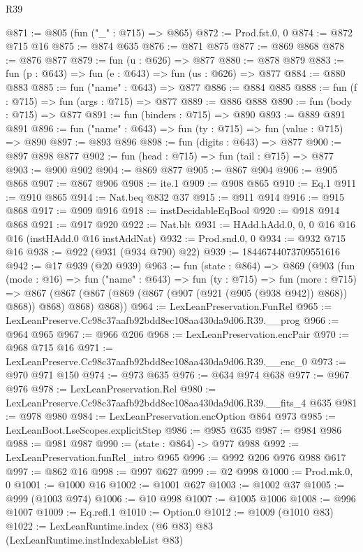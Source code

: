 \begin{lexlean}{R39}
\begin{coremodule}
@871 := @805 (fun ("_" : @715) => @865)
@872 := Prod.fst.{0, 0}
@874 := @872 @715 @16
@875 := @874 @635
@876 := @871 @875
@877 := @869 @868
@878 := @876 @877
@879 := fun (u : @626) => @877
@880 := @878 @879
@883 := fun (p : @643) => fun (e : @643) => fun (us : @626) => @877
@884 := @880 @883
@885 := fun ("name" : @643) => @877
@886 := @884 @885
@888 := fun (f : @715) => fun (args : @715) => @877
@889 := @886 @888
@890 := fun (body : @715) => @877
@891 := fun (binders : @715) => @890
@893 := @889 @891 @891
@896 := fun ("name" : @643) => fun (ty : @715) => fun (value : @715) => @890
@897 := @893 @896
@898 := fun (digits : @643) => @877
@900 := @897 @898 @877
@902 := fun (head : @715) => fun (tail : @715) => @877
@903 := @900 @902
@904 := @869 @877
@905 := @867 @904
@906 := @905 @868
@907 := @867 @906
@908 := ite.{1}
@909 := @908 @865
@910 := Eq.{1}
@911 := @910 @865
@914 := Nat.beq @832 @37
@915 := @911 @914
@916 := @915 @868
@917 := @909 @916
@918 := instDecidableEqBool
@920 := @918 @914 @868
@921 := @917 @920
@922 := Nat.blt
@931 := HAdd.hAdd.{0, 0, 0} @16 @16 @16 (instHAdd.{0} @16 instAddNat)
@932 := Prod.snd.{0, 0}
@934 := @932 @715 @16
@938 := @922 (@931 (@934 @790) @22)
@939 := 18446744073709551616
@942 := @17 @939 (@20 @939)
@963 := fun (state : @864) =>
  @869
    (@903
      (fun (mode : @16) =>
      fun ("name" : @643) =>
      fun (ty : @715) =>
      fun (more : @715) =>
      @867 (@867 (@867 (@869 (@867 (@907 (@921 (@905 (@938 @942)) @868)) @868)) @868) @868) @868))
@964 := LexLeanPreservation.FunRel
@965 := LexLeanPreserve.Cc98c37aafb92bdd8ec108aa430da9d06.R39.__prog
@966 := @964 @965
@967 := @966 @206
@968 := LexLeanPreservation.encPair
@970 := @968 @715 @16
@971 := LexLeanPreserve.Cc98c37aafb92bdd8ec108aa430da9d06.R39.__enc_0
@973 := @970 @971 @150
@974 := @973 @635
@976 := @634 @974 @638
@977 := @967 @976
@978 := LexLeanPreservation.Rel
@980 := LexLeanPreserve.Cc98c37aafb92bdd8ec108aa430da9d06.R39.__fits_4 @635
@981 := @978 @980
@984 := LexLeanPreservation.encOption @864 @973
@985 := LexLeanBoot.LseScopes.explicitStep
@986 := @985 @635
@987 := @984 @986
@988 := @981 @987
@990 := (state : @864) -> @977 @988
@992 := LexLeanPreservation.funRel_intro @965
@996 := @992 @206 @976 @988 @617
@997 := @862 @16
@998 := @997 @627
@999 := @2 @998
@1000 := Prod.mk.{0, 0}
@1001 := @1000 @16
@1002 := @1001 @627
@1003 := @1002 @37
@1005 := @999 (@1003 @974)
@1006 := @10 @998
@1007 := @1005 @1006
@1008 := @996 @1007
@1009 := Eq.refl.{1}
@1010 := Option.{0}
@1012 := @1009 (@1010 @83)
@1022 := LexLeanRuntime.index
    (@6 @83)
    @83
    (LexLeanRuntime.instIndexableList @83)

\end{coremodule}
\end{lexlean}
